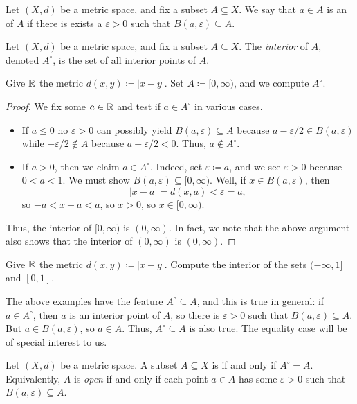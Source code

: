 \documentclass[../main.tex]{subfiles}
\begin{document}
\begin{definition}
     Let $(X,d)$ be a metric space, and fix a subset $A \subseteq X$. We say that $a \in A$ is an  of $A$ if there is exists a $\varepsilon > 0$ such that $B(a,\varepsilon) \subseteq A$.
\end{definition}
\begin{definition}[interior]
    Let $(X,d)$ be a metric space, and fix a subset $A \subseteq X$. The \emph{interior} of $A$, denoted $A^\circ$, is the set of all interior points of $A$. %
\end{definition}
\begin{example} \label{exe:basic-interiors}
    Give $\mathbb R$ the metric $d(x,y)\coloneqq|x-y|$. Set $A\coloneqq[0,\infty)$, and we compute $A^\circ$.
\end{example}
\begin{proof}
    We fix some $a\in\mathbb R$ and test if $a\in A^\circ$ in various cases.
    \begin{itemize}
        \item If $a\le0$ no $\varepsilon>0$ can possibly yield $B(a,\varepsilon)\subseteq A$ because $a-\varepsilon/2\in B(a,\varepsilon)$ while $-\varepsilon/2\notin A$ because $a-\varepsilon/2<0$. Thus, $a\notin A^\circ$.
        \item If $a>0$, then we claim $a\in A^\circ$. Indeed, set $\varepsilon\coloneqq a$, and we see $\varepsilon>0$ because $0<a<1$. We must show $B(a,\varepsilon)\subseteq[0,\infty)$. Well, if $x\in B(a,\varepsilon)$, then
        \[|x-a|=d(x,a)<\varepsilon=a,\]
        so $-a<x-a<a$, so $x>0$, so $x\in[0,\infty)$.
    \end{itemize}
    Thus, the interior of $[0,\infty)$ is $(0,\infty)$. In fact, we note that the above argument also shows that the interior of $(0,\infty)$ is $(0,\infty)$.
\end{proof}
\begin{exe}
    Give $\mathbb R$ the metric $d(x,y)\coloneqq|x-y|$. Compute the interior of the sets $(-\infty,1]$ and $[0,1]$.
\end{exe}
The above examples have the feature $A^\circ\subseteq A$, and this is true in general: if $a\in A^\circ$, then $a$ is an interior point of $A$, so there is $\varepsilon>0$ such that $B(a,\varepsilon)\subseteq A$. But $a\in B(a,\varepsilon)$, so $a\in A$. Thus, $A^\circ\subseteq A$ is also true. The equality case will be of special interest to us.
\begin{definition}
    Let $(X,d)$ be a metric space. A subset $A\subseteq X$ is  if and only if $A^\circ=A$. Equivalently, $A$ is \textit{open} if and only if each point $a\in A$ has some $\varepsilon>0$ such that $B(a,\varepsilon)\subseteq A$.
\end{definition}
\end{document}
